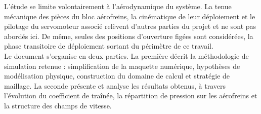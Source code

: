 L'étude se limite volontairement à l'aérodynamique du système. La tenue mécanique des pièces du bloc aérofreins, la cinématique de
leur déploiement et le pilotage du servomoteur associé relèvent d'autres parties du projet et ne sont pas abordés ici. De même,
seules des positions d'ouverture figées sont considérées, la phase transitoire de déploiement sortant du périmètre de ce travail.\\

Le document s'organise en deux parties. La première décrit la méthodologie de simulation retenue : simplification de la maquette
numérique, hypothèses de modélisation physique, construction du domaine de calcul et stratégie de maillage. La seconde présente et
analyse les résultats obtenus, à travers l'évolution du coefficient de traînée, la répartition de pression sur les aérofreins et
la structure des champs de vitesse.

\newpage
